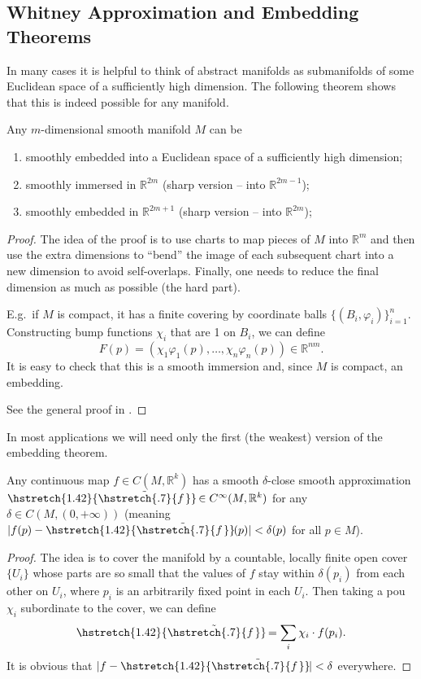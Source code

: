 \documentclass[english,letterpaper]{article}%
\numberwithin{equation}{section}
\numberwithin{figure}{section}
\numberwithin{table}{section}
\theoremstyle{definition}
\theoremstyle{definition}
\theoremstyle{definition}
\theoremstyle{plain}
\theoremstyle{plain}
\theoremstyle{plain}
\theoremstyle{plain}
\theoremstyle{remark}
\theoremstyle{remark}
\newcommand\wt[1]{\hstretch{1.42}{\tilde{\hstretch{.7}{#1\mkern2mu}}}\mkern-2mu}
\begin{document}
\subsection{Whitney Approximation and Embedding Theorems}

In many cases it is helpful to think of abstract manifolds as submanifolds of some Euclidean space of a sufficiently high dimension. The following theorem shows that this is indeed possible for any manifold.

\begin{thm}
    Any $m$-dimensional smooth manifold $M$ can be
    \begin{enumerate}
        \item smoothly embedded into a Euclidean space of a sufficiently high dimension;
        \item smoothly immersed in $\mathbb{R}^{2m}$ (sharp version -- into $\mathbb{R}^{2m-1}$);
        \item smoothly embedded in $\mathbb{R}^{2m+1}$ (sharp version -- into $\mathbb{R}^{2m}$);
    \end{enumerate}
    \end{thm}
\begin{proof}
    The idea of the proof is to use charts to map pieces of $M$ into $\mathbb{R}^m$ and then use the extra dimensions to ``bend'' the image of each subsequent chart into a new dimension to avoid self-overlaps. Finally, one needs to reduce the final dimension as much as possible (the hard part).

    E.g.\ if $M$ is compact, it has a finite covering by coordinate balls $\{(B_i,\varphi_i)\}_{i=1}^n$. Constructing bump functions $\chi_i$ that are 1 on $B_i$, we can define
    \[
        F(p)=(\chi_1\varphi_1(p),\ldots, \chi_n\varphi_n(p))\in\mathbb{R}^{nm}.
    \]
    It is easy to check that this is a smooth immersion and, since $M$ is compact, an embedding.

    See the general proof in \cite[Thm. 6.15]{Lee}.
\end{proof}

In most applications we will need only the first (the weakest) version of the embedding theorem.


\begin{thm}
    Any continuous map $f\in C(M,\mathbb{R}^k)$ has a smooth $\delta$-close smooth approximation $\wt{f}\in C^\infty(M,\mathbb{R}^k)$ for any $\delta\in C(M,(0,+\infty))$ (meaning $|f(p)-\wt f(p)|<\delta(p)$ for all $p\in M$).
\end{thm}
\begin{proof}
    The idea is to cover the manifold by a countable, locally finite open cover $\{U_i\}$ whose parts are so small that the values of $f$ stay within $\delta(p_i)$ from each other on $U_i$, where $p_i$ is an arbitrarily fixed point in each $U_i$. Then taking a \gls{pou} $\chi_i$ subordinate to the cover, we can define
    \[
        \wt{f}=\sum_i \chi_i\cdot f(p_i).
    \]
    It is obvious that $|f-\wt{f}|<\delta$ everywhere.
\end{proof}
\end{document}

